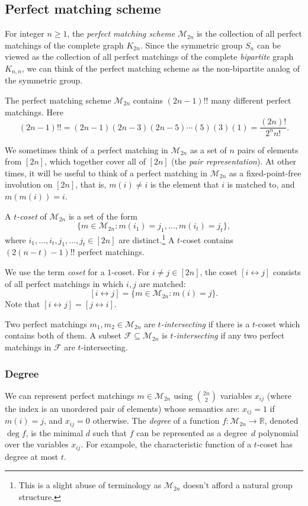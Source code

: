 \documentclass[10pt,a4paper]{amsart}
\theoremstyle{definition}
\providecommand{\dcoset}[2]{[#1 \leftrightarrow #2]}
\providecommand{\cM}{\mathcal{M}}
\begin{document}
\subsection{Perfect matching scheme} \label{sec:prel-pms}

For integer $n \ge 1$, the \emph{perfect matching scheme} $\cM_{2n}$ is the collection of all perfect matchings of the complete graph $K_{2n}$. Since the symmetric group $S_n$ can be viewed as the collection of all perfect matchings of the complete \emph{bipartite} graph $K_{n,n}$, we can think of the perfect matching scheme as the non-bipartite analog of the symmetric group.

The perfect matching scheme $\cM_{2n}$ contains $(2n-1)!!$ many different perfect matchings. Here
\[
 (2n-1)!! = (2n-1)(2n-3)(2n-5)\cdots(5)(3)(1) = \frac{(2n)!}{2^nn!}.
\]

We sometimes think of a perfect matching in $\cM_{2n}$ as a set of $n$ pairs of elements from $[2n]$, which together cover all of $[2n]$ (the \emph{pair representation}). At other times, it will be useful to think of a perfect matching in $\cM_{2n}$ as a fixed-point-free involution on $[2n]$, that is, $m(i) \neq i$ is the element that $i$ is matched to, and $m(m(i)) = i$.

A \emph{$t$-coset} of $\cM_{2n}$ is a set of the form
\[
 \{m \in \cM_{2n} : m(i_1) = j_1, \ldots, m(i_t) = j_t\},
\]
where $i_1,\ldots,i_t,j_1,\ldots,j_t \in [2n]$ are distinct.\footnote{This is a slight abuse of terminology as $\cM_{2n}$ doesn't afford a natural group structure.} 
A $t$-coset contains $(2(n-t)-1)!!$ perfect matchings.

We use the term \emph{coset} for a $1$-coset. For $i \neq j \in [2n]$, the coset $\dcoset{i}{j}$ consists of all perfect matchings in which $i,j$ are matched:
\[
 \dcoset{i}{j} = \{m \in \cM_{2n} : m(i) = j\}.
\]
Note that $\dcoset{i}{j} = \dcoset{j}{i}$.

Two perfect matchings $m_1,m_2 \in \cM_{2n}$ are \emph{$t$-intersecting} if there is a $t$-coset which contains both of them. A subset $\mathcal{F} \subseteq \cM_{2n}$ is \emph{$t$-intersecting} if any two perfect matchings in $\mathcal{F}$ are $t$-intersecting.

\subsubsection{Degree} \label{sec:degree-pms}

We can represent perfect matchings $m \in \cM_{2n}$ using $\binom{2n}{2}$ variables $x_{ij}$ (where the index is an unordered pair of elements) whose semantics are: $x_{ij} = 1$ if $m(i) = j$, and $x_{ij} = 0$ otherwise. The \emph{degree} of a function $f\colon \cM_{2n} \to \mathbb{R}$, denoted $\deg f$, is the minimal $d$ such that $f$ can be represented as a degree~$d$ polynomial over the variables $x_{ij}$. For exampole, the characteristic function of a $t$-coset has degree at most $t$.
\end{document}
